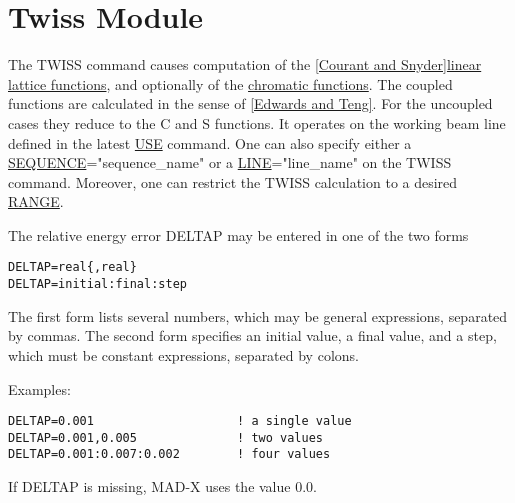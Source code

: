 

\chapter{Twiss Module}

The TWISS command causes computation of the
\href{../Introduction/bibliography.html#courant}{[Courant and
    Snyder]}\href{../Introduction/tables.html#linear}{linear lattice
  functions}, and optionally of the
\href{../Introduction/tables.html#chrom}{chromatic functions}. The
coupled functions are calculated in the sense of
\href{../Introduction/bibliography.html#edwards}{[Edwards and
    Teng]}. For the uncoupled cases they reduce to the C and S
functions. It operates on the working beam line defined in the latest
\href{../control/general.html#use}{USE} command. One can also specify
either a \href{../Introduction/sequence.html}{SEQUENCE}="sequence\_name"
or a \href{../Introduction/line.html}{LINE}="line\_name" on the TWISS
command. Moreover, one can restrict the TWISS calculation to a desired
\href{../Introduction/ranges.html#range}{RANGE}.  

The relative energy error DELTAP may be entered in one of the two forms
\begin{verbatim}
DELTAP=real{,real}
DELTAP=initial:final:step
\end{verbatim} 

The first form lists several numbers, which may be general expressions,
separated by commas. The second form specifies an initial value, a final
value, and a step, which must be constant expressions, separated by
colons.  

Examples: 
\begin{verbatim}
DELTAP=0.001                    ! a single value
DELTAP=0.001,0.005              ! two values
DELTAP=0.001:0.007:0.002        ! four values
\end{verbatim}

If DELTAP is missing, MAD-X uses the value 0.0. 

